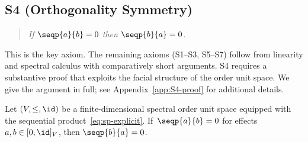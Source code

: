 \subsection*{S4 (Orthogonality Symmetry)}\label{subsec:S4}

\begin{quote}
\emph{If $\seqp{a}{b} = 0$ then $\seqp{b}{a} = 0$.}
\end{quote}

This is the key axiom. The remaining axioms (S1--S3, S5--S7) follow from
linearity and spectral calculus with comparatively short arguments. S4
requires a substantive proof that exploits the facial structure of the
order unit space. We give the argument in full; see
Appendix~\ref{app:S4-proof} for additional details.

\begin{theorem}\label{thm:S4}
Let $(V, \le, \id)$ be a finite-dimensional spectral order unit
space equipped with the sequential product~\eqref{eq:sp-explicit}. If\,
$\seqp{a}{b} = 0$ for effects $a,b \in [0,\id]_V$, then
$\seqp{b}{a} = 0$.
\end{theorem}

